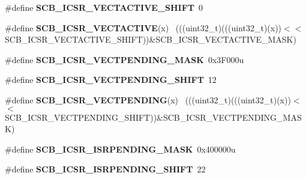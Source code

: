 \begin{DoxyCompactItemize}
\item 
\hypertarget{group___s_c_b___register___masks_ga02696369c8528292cf4f41897d83b156}{}\#define {\bfseries S\+C\+B\+\_\+\+I\+C\+S\+R\+\_\+\+V\+E\+C\+T\+A\+C\+T\+I\+V\+E\+\_\+\+S\+H\+I\+F\+T}~0\label{group___s_c_b___register___masks_ga02696369c8528292cf4f41897d83b156}

\item 
\hypertarget{group___s_c_b___register___masks_gacb9e76e7fa9000878ba2be80556f2013}{}\#define {\bfseries S\+C\+B\+\_\+\+I\+C\+S\+R\+\_\+\+V\+E\+C\+T\+A\+C\+T\+I\+V\+E}(x)                                  ~(((uint32\+\_\+t)(((uint32\+\_\+t)(x))$<$$<$S\+C\+B\+\_\+\+I\+C\+S\+R\+\_\+\+V\+E\+C\+T\+A\+C\+T\+I\+V\+E\+\_\+\+S\+H\+I\+F\+T))\&S\+C\+B\+\_\+\+I\+C\+S\+R\+\_\+\+V\+E\+C\+T\+A\+C\+T\+I\+V\+E\+\_\+\+M\+A\+S\+K)\label{group___s_c_b___register___masks_gacb9e76e7fa9000878ba2be80556f2013}

\item 
\hypertarget{group___s_c_b___register___masks_ga75b38d5feedc920a7d0a51484330b7d7}{}\#define {\bfseries S\+C\+B\+\_\+\+I\+C\+S\+R\+\_\+\+V\+E\+C\+T\+P\+E\+N\+D\+I\+N\+G\+\_\+\+M\+A\+S\+K}~0x3\+F000u\label{group___s_c_b___register___masks_ga75b38d5feedc920a7d0a51484330b7d7}

\item 
\hypertarget{group___s_c_b___register___masks_ga345baf83f90de34c6c67edb24968fcc7}{}\#define {\bfseries S\+C\+B\+\_\+\+I\+C\+S\+R\+\_\+\+V\+E\+C\+T\+P\+E\+N\+D\+I\+N\+G\+\_\+\+S\+H\+I\+F\+T}~12\label{group___s_c_b___register___masks_ga345baf83f90de34c6c67edb24968fcc7}

\item 
\hypertarget{group___s_c_b___register___masks_ga17bdf1522c873773ad5e72052f2591c6}{}\#define {\bfseries S\+C\+B\+\_\+\+I\+C\+S\+R\+\_\+\+V\+E\+C\+T\+P\+E\+N\+D\+I\+N\+G}(x)                                ~(((uint32\+\_\+t)(((uint32\+\_\+t)(x))$<$$<$S\+C\+B\+\_\+\+I\+C\+S\+R\+\_\+\+V\+E\+C\+T\+P\+E\+N\+D\+I\+N\+G\+\_\+\+S\+H\+I\+F\+T))\&S\+C\+B\+\_\+\+I\+C\+S\+R\+\_\+\+V\+E\+C\+T\+P\+E\+N\+D\+I\+N\+G\+\_\+\+M\+A\+S\+K)\label{group___s_c_b___register___masks_ga17bdf1522c873773ad5e72052f2591c6}

\item 
\hypertarget{group___s_c_b___register___masks_gaccd41792c40fc7ab2b03678da539ad65}{}\#define {\bfseries S\+C\+B\+\_\+\+I\+C\+S\+R\+\_\+\+I\+S\+R\+P\+E\+N\+D\+I\+N\+G\+\_\+\+M\+A\+S\+K}~0x400000u\label{group___s_c_b___register___masks_gaccd41792c40fc7ab2b03678da539ad65}

\item 
\hypertarget{group___s_c_b___register___masks_ga22f457e32a8d6a617ff90bdfb7b874de}{}\#define {\bfseries S\+C\+B\+\_\+\+I\+C\+S\+R\+\_\+\+I\+S\+R\+P\+E\+N\+D\+I\+N\+G\+\_\+\+S\+H\+I\+F\+T}~22\label{group___s_c_b___register___masks_ga22f457e32a8d6a617ff90bdfb7b874de}


\end{DoxyCompactItemize}

